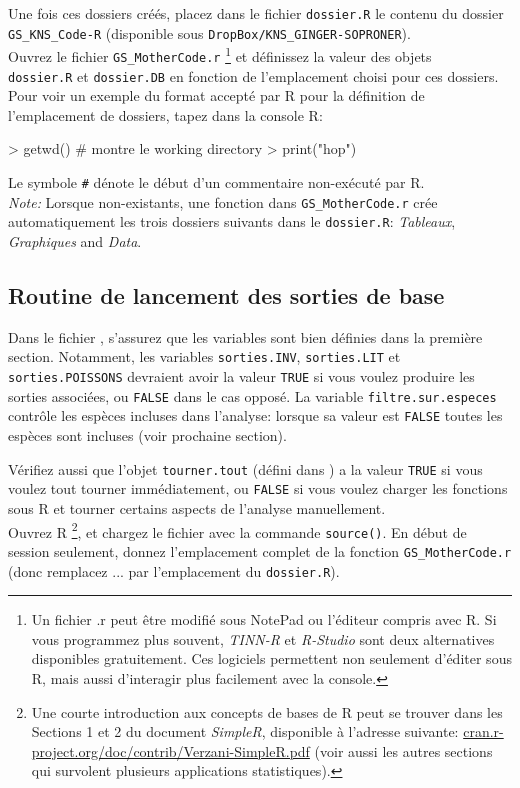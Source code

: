 \documentclass{article}
\begin{document}
     Une fois ces dossiers créés, placez dans le fichier \texttt{dossier.R}  le contenu du dossier
\texttt{GS\_KNS\_Code-R} (disponible sous
\texttt{DropBox/KNS\_GINGER-SOPRONER}). \\


Ouvrez le fichier \texttt{GS\_MotherCode.r} \footnote{Un fichier .r
  peut être modifié sous NotePad ou l'éditeur
compris avec R. Si vous programmez plus souvent, \emph{TINN-R} et \emph{R-Studio}
sont deux alternatives disponibles gratuitement. Ces logiciels
permettent non seulement
d'éditer sous R, mais aussi d'interagir plus facilement avec la
console. } et définissez la valeur des objets \\ \texttt{dossier.R} et \texttt{dossier.DB}
en fonction de l'emplacement choisi pour ces dossiers.
Pour voir un exemple du format accepté par R pour la
  définition de l'emplacement de dossiers, tapez dans la console R:
\begin{Schunk}
\begin{Sinput}
> getwd() # montre le working directory
> print("hop")
\end{Sinput}
\end{Schunk}
  \noindent Le symbole \texttt{\#} dénote le début d'un commentaire non-exécuté
par R.\\


\noindent \emph{Note:} Lorsque non-existants, une fonction dans \texttt{GS\_MotherCode.r} crée
automatiquement les trois dossiers
suivants dans le \texttt{dossier.R}: \emph{Tableaux},
\emph{Graphiques} and \emph{Data}. \\

   \subsection*{Routine de lancement des sorties de base}

   Dans le fichier \mcode, s'assurez que les variables sont bien définies dans
   la première section. Notamment, les variables
   \texttt{sorties.INV}, \texttt{sorties.LIT} et
   \texttt{sorties.POISSONS} devraient avoir la valeur \texttt{TRUE} si vous
   voulez produire les sorties associées, ou \texttt{FALSE} dans le
   cas opposé. La variable \texttt{filtre.sur.especes} contrôle les
   espèces incluses dans l'analyse: lorsque sa valeur est
   \texttt{FALSE} toutes les espèces sont incluses (voir prochaine
   section).

  Vérifiez aussi que l'objet \texttt{tourner.tout} (défini dans \mcode) a la valeur \texttt{TRUE} si vous voulez
tout tourner immédiatement, ou \texttt{FALSE} si vous voulez
charger les fonctions sous R et tourner certains
aspects de l'analyse manuellement.
\\
Ouvrez R \footnote{Une courte introduction aux concepts de bases de R peut
  se trouver dans les Sections 1 et 2 du document \emph{SimpleR}, disponible
  à l'adresse suivante:
  \url{cran.r-project.org/doc/contrib/Verzani-SimpleR.pdf} (voir aussi
  les autres sections qui survolent plusieurs applications
  statistiques).}, et chargez le fichier \mcode {} avec la commande
\texttt{source()}.
  En début de session seulement, donnez
  l'emplacement complet de la fonction \texttt{GS\_MotherCode.r} (donc
  remplacez ... par l'emplacement du \texttt{dossier.R}).
\end{document}
